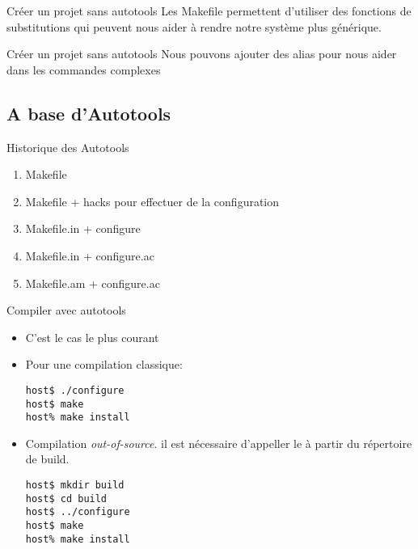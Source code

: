 \begin{frame}[fragile=singleslide]{Créer un projet sans autotools}
  Les  Makefile permettent d'utiliser  des fonctions  de substitutions
  qui  peuvent  nous aider  à  rendre  notre  système plus  générique.
  
\end{frame}

\begin{frame}[fragile=singleslide]{Créer un projet sans autotools}
  Nous pouvons  ajouter des alias  pour nous aider dans  les commandes
  complexes
  
\end{frame}

\subsection{A base d'Autotools}

\begin{frame}[fragile=singleslide]{Historique des Autotools}
  \begin{enumerate}
  \item Makefile
  \item Makefile + hacks pour effectuer de la configuration
  \item Makefile.in + configure
  \item Makefile.in + configure.ac
  \item Makefile.am + configure.ac
  \end{enumerate}
\end{frame}


\begin{frame}[fragile=singleslide]{Compiler avec autotools}
  \begin{itemize}
  \item C'est le cas le plus courant
  \item Pour une compilation classique:
\begin{lstlisting}
host$ ./configure
host$ make
host% make install
\end{lstlisting} %
  \item Compilation \emph{out-of-source}. il est nécessaire d'appeller
    le  à partir du répertoire de build.
\begin{lstlisting}
host$ mkdir build
host$ cd build
host$ ../configure
host$ make
host% make install
\end{lstlisting} %
  \end{itemize}
\end{frame}

